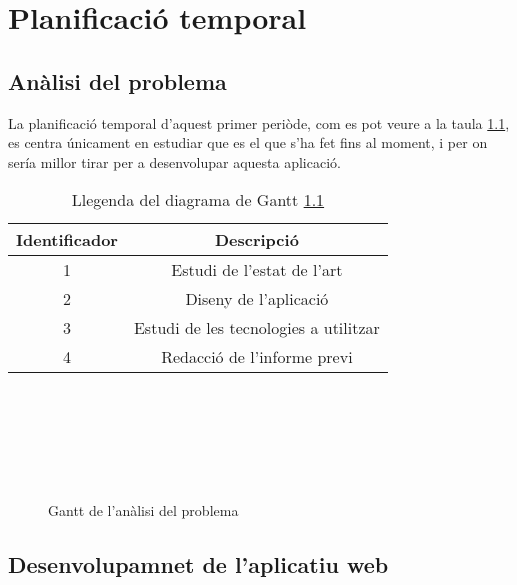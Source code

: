 \chapter{Planificació temporal}

\section{Anàlisi del problema}

La planificació temporal d'aquest primer periòde, com es pot veure a la taula \ref{llegenda-gantt-analisi}, es centra únicament en estudiar que es el que s'ha fet fins al moment, i per on sería millor tirar per a desenvolupar aquesta aplicació.

\begin{table}[h!]
	\caption{Llegenda del diagrama de Gantt \ref{gantt-analisi}}
	\label{llegenda-gantt-analisi}
	\begin{center}
		\begin{tabular}{| c | c |}
			\hline
			{\bf Identificador}	& {\bf Descripció} \\ \hline
			1					& Estudi de l'estat de l'art \\
			2					& Diseny de l'aplicació \\
			3					& Estudi de les tecnologies a utilitzar \\
			4					& Redacció de l'informe previ \\ \hline
		\end{tabular}
	\end{center}
\end{table}

\begin{figure}[h!]
	\caption{Gantt de l'anàlisi del problema}
	\label{gantt-analisi}
	\begin{center}
		\begin{ganttchart}[vgrid]{14}
			 \\
			 \\
			 \\
			 \\
			 \\
		\end{ganttchart}
	\end{center}
\end{figure}

\clearpage
\section{Desenvolupamnet de l'aplicatiu web}

